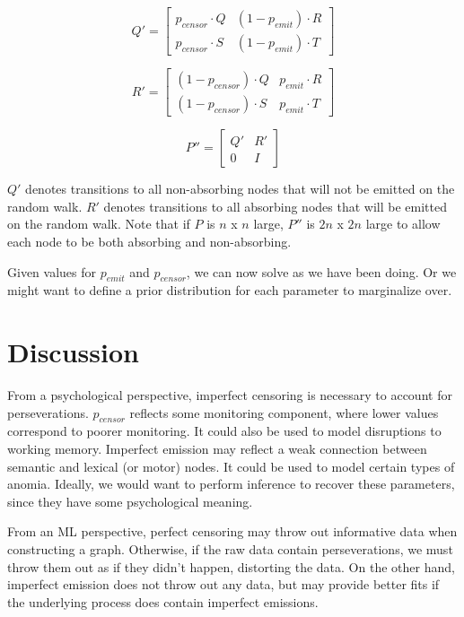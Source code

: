 \documentclass{article}
\begin{document}
\[
    Q'=
    \begin{bmatrix}
        p_{censor} \cdot Q & (1-p_{emit}) \cdot R \\
        p_{censor} \cdot S & (1-p_{emit}) \cdot T
    \end{bmatrix}
\]

\[
    R'=
    \begin{bmatrix}
        (1-p_{censor}) \cdot Q & p_{emit} \cdot R \\
        (1-p_{censor}) \cdot S & p_{emit} \cdot T
    \end{bmatrix}
\]

\[
    P''=
    \begin{bmatrix}
        Q' & R' \\
        0  & I
    \end{bmatrix}
\]

\vspace{5mm}

$Q'$ denotes transitions to all non-absorbing nodes that will not be emitted on
the random walk. $R'$ denotes transitions to all absorbing nodes that will be
emitted on the random walk.  Note that if $P$ is $n$ x $n$ large, $P''$ is $2n$
x $2n$ large to allow each node to be both absorbing and non-absorbing.

\vspace{5mm}

Given values for $p_{emit}$ and $p_{censor}$, we can now solve as we have been
doing. Or we might want to define a prior distribution for each parameter to
marginalize over.

\section{Discussion}

From a psychological perspective, imperfect censoring is necessary to account
for perseverations. $p_{censor}$ reflects some monitoring component, where
lower values correspond to poorer monitoring. It could also be used to model
disruptions to working memory. Imperfect emission may reflect a weak connection
between semantic and lexical (or motor) nodes. It could be used to model
certain types of anomia. Ideally, we would want to perform inference to recover
these parameters, since they have some psychological meaning.


\vspace{5mm}

From an ML perspective, perfect censoring may throw out informative data when
constructing a graph. Otherwise, if the raw data contain perseverations, we
must throw them out as if they didn't happen, distorting the data. On the other
hand, imperfect emission does not throw out any data, but may provide better
fits if the underlying process does contain imperfect emissions.
\end{document}
